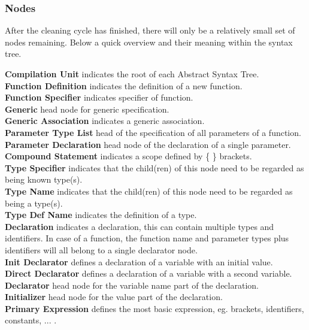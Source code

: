 \documentclass[12pt]{article}
\begin{document}
\subsubsection{Nodes}
After the cleaning cycle has finished, there will only be a relatively small set of nodes remaining. Below a quick overview and their meaning within the syntax tree.

\begin{multicols}{2}
	\noindent
	\textbf{Compilation Unit} indicates the root of each Abstract Syntax Tree.\\
	\textbf{Function Definition} indicates the definition of a new function.\\
	\textbf{Function Specifier} indicates specifier of function.\\
	\textbf{Generic} head node for generic specification.\\
	\textbf{Generic Association} indicates a generic association.\\
	\textbf{Parameter Type List} head of the specification of all parameters of a function.\\
	\textbf{Parameter Declaration} head node of the declaration of a single parameter.\\
	\textbf{Compound Statement} indicates a scope defined by \{ \} brackets.\\
	\textbf{Type Specifier} indicates that the child(ren) of this node need to be regarded as being known type(s).\\
	\textbf{Type Name} indicates that the child(ren) of this node need to be regarded as being a type(s).\\
	\textbf{Type Def Name} indicates the definition of a type.\\
	\textbf{Declaration} indicates a declaration, this can contain multiple types and identifiers. In case of a function, the function name and parameter types plus identifiers will all belong to a single declarator node.\\
	\textbf{Init Declarator} defines a declaration of a variable with an initial value.\\
	\textbf{Direct Declarator} defines a declaration of a variable with a second variable.\\
	\textbf{Declarator} head node for the variable name part of the declaration.\\
	\textbf{Initializer} head node for the value part of the declaration.\\
	\textbf{Primary Expression} defines the most basic expression, eg. brackets, identifiers, constants, ... .\\

\end{multicols}
\end{document}
